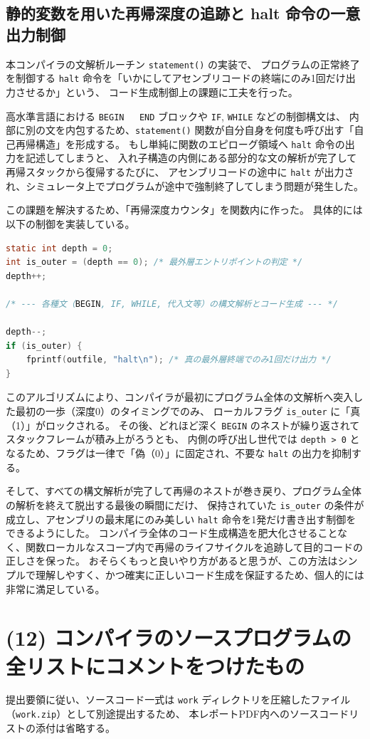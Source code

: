 \documentclass[11pt,a4paper,dvipdfmx]{bxjsarticle}
\begin{document}
\subsection*{静的変数を用いた再帰深度の追跡と halt 命令の一意出力制御}
本コンパイラの文解析ルーチン \texttt{statement()} の実装で、
プログラムの正常終了を制御する \texttt{halt} 命令を「いかにしてアセンブリコードの終端にのみ1回だけ出力させるか」という、
コード生成制御上の課題に工夫を行った。

高水準言語における \texttt{BEGIN ~ END} ブロックや \texttt{IF}, \texttt{WHILE} などの制御構文は、
内部に別の文を内包するため、\texttt{statement()} 関数が自分自身を何度も呼び出す「自己再帰構造」を形成する。
もし単純に関数のエピローグ領域へ \texttt{halt} 命令の出力を記述してしまうと、
入れ子構造の内側にある部分的な文の解析が完了して再帰スタックから復帰するたびに、
アセンブリコードの途中に \texttt{halt} が出力され、シミュレータ上でプログラムが途中で強制終了してしまう問題が発生した。

この課題を解決するため、「再帰深度カウンタ」を関数内に作った。
具体的には以下の制御を実装している。
\begin{lstlisting}[language=C, basicstyle=\small\ttfamily]
static int depth = 0;
int is_outer = (depth == 0); /* 最外層エントリポイントの判定 */
depth++;

/* --- 各種文（BEGIN, IF, WHILE, 代入文等）の構文解析とコード生成 --- */

depth--;
if (is_outer) {
    fprintf(outfile, "halt\n"); /* 真の最外層終端でのみ1回だけ出力 */
}
\end{lstlisting}

このアルゴリズムにより、コンパイラが最初にプログラム全体の文解析へ突入した最初の一歩（深度0）のタイミングでのみ、
ローカルフラグ \texttt{is\_outer} に「真（1）」がロックされる。
その後、どれほど深く \texttt{BEGIN} のネストが繰り返されてスタックフレームが積み上がろうとも、
内側の呼び出し世代では \texttt{depth > 0} となるため、フラグは一律で「偽（0）」に固定され、不要な \texttt{halt} の出力を抑制する。

そして、すべての構文解析が完了して再帰のネストが巻き戻り、プログラム全体の解析を終えて脱出する最後の瞬間にだけ、
保持されていた \texttt{is\_outer} の条件が成立し、アセンブリの最末尾にのみ美しい \texttt{halt} 命令を1発だけ書き出す制御をできるようにした。
コンパイラ全体のコード生成構造を肥大化させることなく、関数ローカルなスコープ内で再帰のライフサイクルを追跡して目的コードの正しさを保った。
おそらくもっと良いやり方があると思うが、この方法はシンプルで理解しやすく、かつ確実に正しいコード生成を保証するため、個人的には非常に満足している。

\section*{(12) コンパイラのソースプログラムの全リストにコメントをつけたもの}
提出要領に従い、ソースコード一式は \texttt{work} ディレクトリを圧縮したファイル（\texttt{work.zip}）として別途提出するため、
本レポートPDF内へのソースコードリストの添付は省略する。

\end{document}
